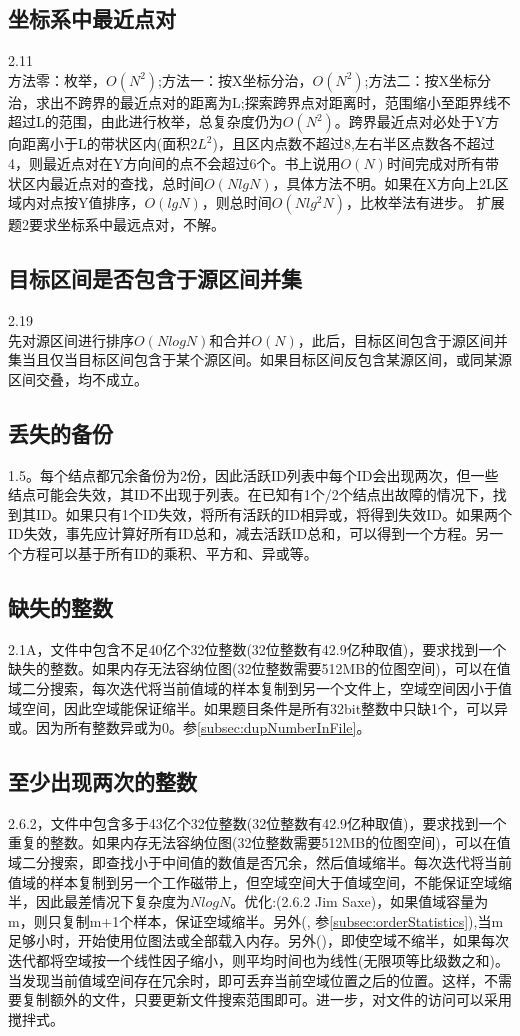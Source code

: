 \subsection{坐标系中最近点对}
\cite{bop}2.11\\
方法零：枚举，$O(N^2)$;方法一：按X坐标分治，$O(N^2)$;方法二：按X坐标分治，求出不跨界的最近点对的距离为L;探索跨界点对距离时，范围缩小至距界线不超过L的范围，由此进行枚举，总复杂度仍为$O(N^2)$。跨界最近点对必处于Y方向距离小于L的带状区内(面积$2L^2$)，且区内点数不超过8,左右半区点数各不超过4，则最近点对在Y方向间的点不会超过6个。书上说用$O(N)$时间完成对所有带状区内最近点对的查找，总时间$O(NlgN)$，具体方法不明。如果在X方向上2L区域内对点按Y值排序，$O(lgN)$，则总时间$O(Nlg^{2}N)$，比枚举法有进步。
扩展题2要求坐标系中最远点对，不解。

\subsection{目标区间是否包含于源区间并集}
\cite{bop}2.19\\
先对源区间进行排序$O(NlogN)$和合并$O(N)$，此后，目标区间包含于源区间并集当且仅当目标区间包含于某个源区间。如果目标区间反包含某源区间，或同某源区间交叠，均不成立。

\subsection{丢失的备份}
\cite{bop}1.5。每个结点都冗余备份为2份，因此活跃ID列表中每个ID会出现两次，但一些结点可能会失效，其ID不出现于列表。在已知有1个/2个结点出故障的情况下，找到其ID。如果只有1个ID失效，将所有活跃的ID相异或，将得到失效ID。如果两个ID失效，事先应计算好所有ID总和，减去活跃ID总和，可以得到一个方程。另一个方程可以基于所有ID的乘积、平方和、异或等。
\subsection{缺失的整数}
\cite{pp}2.1A，文件中包含不足40亿个32位整数(32位整数有42.9亿种取值)，要求找到一个缺失的整数。如果内存无法容纳位图(32位整数需要512MB的位图空间)，可以在值域二分搜索，每次迭代将当前值域的样本复制到另一个文件上，空域空间因小于值域空间，因此空域能保证缩半。如果题目条件是所有32bit整数中只缺1个，可以异或。因为所有整数异或为0。参\ref{subsec:dupNumberInFile}。

\subsection{至少出现两次的整数}
\cite{pp}2.6.2，文件中包含多于43亿个32位整数(32位整数有42.9亿种取值)，要求找到一个重复的整数。如果内存无法容纳位图(32位整数需要512MB的位图空间)，可以在值域二分搜索，即查找小于中间值的数值是否冗余，然后值域缩半。每次迭代将当前值域的样本复制到另一个工作磁带上，但空域空间大于值域空间，不能保证空域缩半，因此最差情况下复杂度为$NlogN$。优化:(\cite{pp}2.6.2 Jim Saxe)，如果值域容量为m，则只复制m+1个样本，保证空域缩半。另外(\cite{self}, 参\ref{subsec:orderStatistics}),当m足够小时，开始使用位图法或全部载入内存。另外(\cite{self})，即使空域不缩半，如果每次迭代都将空域按一个线性因子缩小，则平均时间也为线性(无限项等比级数之和)。当发现当前值域空间存在冗余时，即可丢弃当前空域位置之后的位置。这样，不需要复制额外的文件，只要更新文件搜索范围即可。进一步，对文件的访问可以采用搅拌式。

